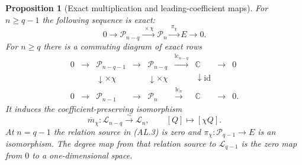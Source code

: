 \documentclass[11pt]{article}
\newtheorem{proposition}{Proposition}
\newcommand{\calP}{\mathcal P}
\newcommand{\calL}{\mathcal L}
\begin{document}
\begin{proposition}[Exact multiplication and leading-coefficient maps]
For $n\ge q-1$ the following sequence is exact:
\begin{equation}\tag{AL.3}
0\longrightarrow\calP_{n-q}\xrightarrow{\ \times\chi\ }
\calP_n\xrightarrow{\ \pi_\chi\ }E\longrightarrow0.
\end{equation}
For $n\ge q$ there is a commuting diagram of exact rows
\begin{equation}\tag{AL.4}
\begin{array}{ccccccccc}
0&\longrightarrow&\calP_{n-q-1}&\longrightarrow&\calP_{n-q}
 &\xrightarrow{\operatorname{lc}_{n-q}}&\mathbb C&\longrightarrow&0\\
 &&\downarrow\scriptstyle\times\chi&&\downarrow\scriptstyle\times\chi
 &&\downarrow\scriptstyle\mathrm{id}&&\\
0&\longrightarrow&\calP_{n-1}&\longrightarrow&\calP_n
 &\xrightarrow{\operatorname{lc}_n}&\mathbb C&\longrightarrow&0.
\end{array}
\end{equation}
It induces the coefficient-preserving isomorphism
\begin{equation}\tag{AL.5}
\overline m_\chi:\calL_{n-q}\xrightarrow{\sim}\calL_n,
\qquad [Q]\longmapsto[\chi Q].
\end{equation}
At $n=q-1$ the relation source in (AL.3) is zero and
$\pi_\chi:\calP_{q-1}\to E$ is an isomorphism. The degree map from that
relation source to $\calL_{q-1}$ is the zero map from $0$ to a
one-dimensional space.
\end{proposition}
\end{document}
